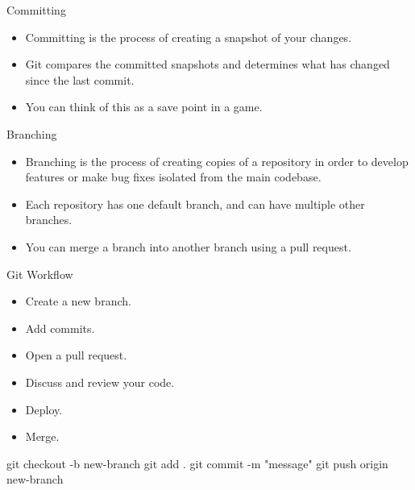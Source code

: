 \documentclass[
    aspectratio=169, 
    usepdftitle=false, 
    xcolor={dvipsnames},
    hyperref={
        colorlinks,
        linkcolor=black,
        urlcolor=blue}
    ]{beamer}
\begin{document}
\begin{frame}{Committing}
    \begin{itemize}
        \item Committing is the process of creating a snapshot of your changes.
        \item Git compares the committed snapshots and determines what has changed since the last commit.
        \item You can think of this as a save point in a game.
    \end{itemize}
\end{frame}

\begin{frame}{Branching}
    \begin{itemize}
        \item Branching is the process of creating copies of a repository in order to develop features or make bug fixes isolated from the main codebase.
        \item Each repository has one default branch, and can have multiple other branches.
        \item You can merge a branch into another branch using a pull request.
    \end{itemize}
\end{frame}

\begin{frame}{Git Workflow}
    \begin{itemize}
        \item Create a new branch.
        \item Add commits.
        \item Open a pull request.
        \item Discuss and review your code.
        \item Deploy.
        \item Merge.
    \end{itemize}

    \begin{lstlistings}[language=bash]
        git checkout -b new-branch
        git add .
        git commit -m "message"
        git push origin new-branch
    \end{lstlistings}
\end{frame}
\end{document}
